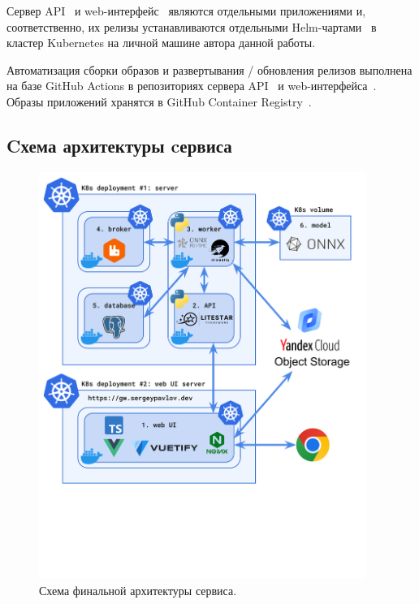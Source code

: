 \documentclass[a4paper,12pt]{extarticle}
\begin{document}
Сервер API~\cite{server} и web-интерфейс~\cite{web_UI} являются отдельными приложениями и,
соответственно, их релизы устанавливаются отдельными Helm-чартами~\cite{server_chart,web_UI_chart} в
кластер Kubernetes на личной машине автора данной работы.\par

Автоматизация сборки образов и развертывания / обновления релизов выполнена на базе GitHub Actions в
репозиториях сервера API~\cite{server_CI} и web-интерфейса~\cite{web_UI_CI}. Образы приложений
хранятся в GitHub Container Registry~\cite{github_packages}.

\newpage
\subsection{Cхема архитектуры cервиса}

\begin{figure}[ht]
	\centering
	\includegraphics[width=0.95\textwidth,trim={0 3.5cm 0 0}]{final_arch.png}
	\caption{Схема финальной архитектуры сервиса.}
	\label{fig:final_arch}
\end{figure}
\end{document}
